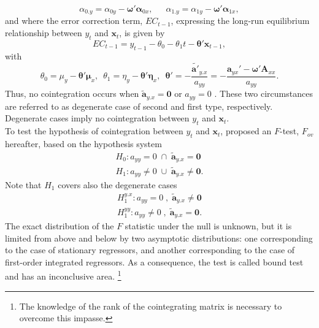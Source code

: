 \begin{equation}\label{eq:ardldet}
\alpha_{0.y}=\alpha_{0y}-\boldsymbol{\omega}'\boldsymbol{\alpha}_{0x}, \enspace \enspace \enspace \alpha_{1.y}=\alpha_{1y}-\boldsymbol{\omega}'\boldsymbol{\alpha}_{1x},
\end{equation}
and where the error correction term, $EC_{t-1}$, expressing the long-run equilibrium relationship between $y_{t}$ and $\mathbf{x}_{t}$, is given by
\begin{equation}\label{eq:ec}
EC_{t-1}=y_{t-1}-\theta_{0}-\theta_{1}t-\boldsymbol{\theta}'\mathbf{x}_{t-1},
\end{equation}
with
\begin{equation}\label{eq:const}
\theta_{0}=\mu_{y}-\boldsymbol{\theta}'\boldsymbol{\mu}_{x}, \enspace \theta_{1}=\eta_{y}-\boldsymbol{\theta}'\boldsymbol{\eta}_{x}, \enspace\boldsymbol{\theta}'=-\frac{\widetilde{\mathbf{a}'}_{y.x}}{a_{yy}}=-\frac{\mathbf{a}_{yx}'-\boldsymbol{\omega}'\mathbf{A}_{xx}}{a_{yy}}.
\end{equation}
Thus, no cointegration occurs when  $\widetilde{\mathbf{a}}_{y.x}=\mathbf{0}$ or $a_{yy}=0$ .
These two circumstances are  referred to as degenerate case of second and first type, respectively. Degenerate cases imply no cointegration between $y_{t}$ and $\mathbf{x}_{t}$.\\
To test the hypothesis of cointegration between $y_{t}$ and $\mathbf{x}_{t}$, \citet{pesaran2001} proposed an $F$-test, $F_{ov}$ hereafter, based on the hypothesis system
\begin{align}\label{eq:h0sys}
H_0: a_{yy}=0 \; \cap \;\widetilde{\mathbf{a}}_{y.x}=\mathbf{0}\\
H_1: a_{yy} \neq 0 \; \cup \;\widetilde{\mathbf{a}}_{y.x}\neq \mathbf{0}.
\end{align}
Note that $H_{1}$ covers also the degenerate cases
\begin{align}\label{eq:h0deg}
H_1^{y.x}: a_{yy}=0 \; , \;\widetilde{\mathbf{a}}_{y.x}\neq\mathbf{0}\\
H_1^{yy}: a_{yy} \neq 0 \; , \;\widetilde{\mathbf{a}}_{y.x} = \mathbf{0}.
\end{align}
The exact distribution of the $F$ statistic under the null is unknown, but it is limited from above and below by two asymptotic distributions: one corresponding to the case of stationary regressors, and another corresponding to the case of first-order integrated regressors. As a consequence, the test is called bound test and has an inconclusive area. 
\footnote{The knowledge of the rank of the cointegrating matrix is necessary to overcome this impasse.}\\
